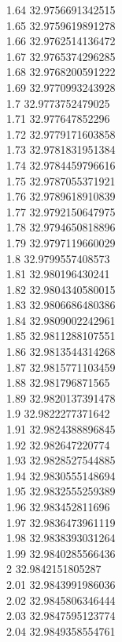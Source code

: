 {1.64	32.9756691342515\\
1.65	32.9759619891278\\
1.66	32.9762514136472\\
1.67	32.9765374296285\\
1.68	32.9768200591222\\
1.69	32.9770993243928\\
1.7	32.9773752479025\\
1.71	32.977647852296\\
1.72	32.9779171603858\\
1.73	32.9781831951384\\
1.74	32.9784459796616\\
1.75	32.9787055371921\\
1.76	32.9789618910839\\
1.77	32.9792150647975\\
1.78	32.9794650818896\\
1.79	32.9797119660029\\
1.8	32.9799557408573\\
1.81	32.980196430241\\
1.82	32.9804340580015\\
1.83	32.9806686480386\\
1.84	32.9809002242961\\
1.85	32.9811288107551\\
1.86	32.9813544314268\\
1.87	32.9815771103459\\
1.88	32.981796871565\\
1.89	32.9820137391478\\
1.9	32.9822277371642\\
1.91	32.9824388896845\\
1.92	32.982647220774\\
1.93	32.9828527544885\\
1.94	32.9830555148694\\
1.95	32.9832555259389\\
1.96	32.983452811696\\
1.97	32.9836473961119\\
1.98	32.9838393031264\\
1.99	32.9840285566436\\
2	32.9842151805287\\
2.01	32.9843991986036\\
2.02	32.9845806346444\\
2.03	32.9847595123774\\
2.04	32.9849358554761\\
}
